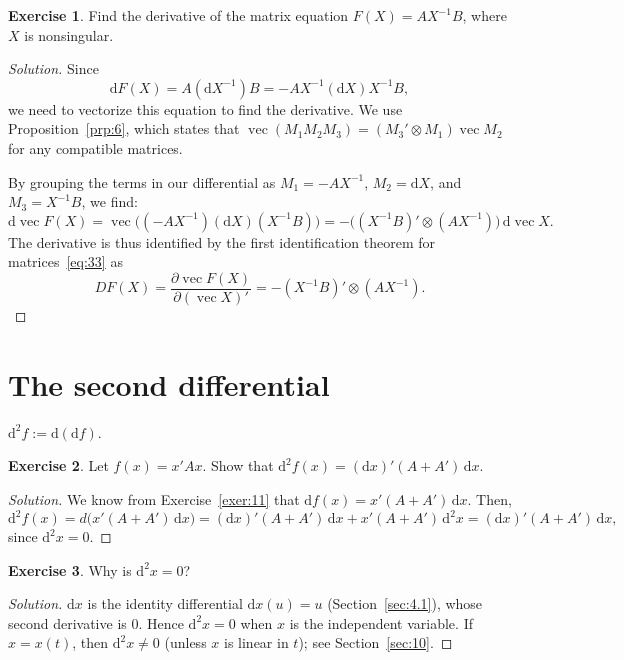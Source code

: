 \documentclass[14pt]{extarticle}
\theoremstyle{plain}
\theoremstyle{definition}
\newtheorem{exercise}{Exercise}
\theoremstyle{remark}
\newenvironment{solution}{%
  \begin{proof}[Solution]%
}{%
  \end{proof}%
}
\DeclareMathOperator{\avec}{vec}
\newcommand{\dd}{\mathrm{d}}
\begin{document}
\begin{exercise}\label{exer:22}
Find the derivative of the matrix equation $F(X) = AX^{-1}B$, where $X$ is nonsingular.
\end{exercise}

\begin{solution}
Since
\[
\dd F(X) = A(\dd X^{-1})B = -AX^{-1}(\dd X)X^{-1}B,
\]
we need to vectorize this equation to find the derivative. We use Proposition~\ref{prp:6}, which states that $\avec(M_1 M_2 M_3) = (M_3' \otimes M_1) \avec M_2$ for any compatible matrices.

By grouping the terms in our differential as $M_1 = -AX^{-1}$, $M_2 = \dd X$, and $M_3 = X^{-1}B$, we find:
\[
\dd\avec F(X) = \avec\bigl((-AX^{-1})(\dd X)(X^{-1}B)\bigr) = -\bigl((X^{-1}B)' \otimes (AX^{-1})\bigr)\, \dd\avec X.
\]
The derivative is thus identified by the first identification theorem for matrices~\eqref{eq:33} as
\[
DF(X) = \frac{\partial \avec F(X)}{\partial(\avec X)'} = -(X^{-1}B)' \otimes (AX^{-1}).
\]
\end{solution}

\section{The second differential}\label{sec:9}

$\dd^2 f := \dd(\dd f)$.

\begin{exercise}\label{exer:23}
Let $f(x) = x'Ax$. Show that $\dd^2 f(x) = (\dd x)'(A + A')\, \dd x$.
\end{exercise}

\begin{solution}
We know from Exercise~\ref{exer:11} that $\dd f(x) = x'(A + A')\, \dd x$. Then,
\[
\dd^2 f(x) = d\bigl(x'(A + A')\, \dd x\bigr) = (\dd x)'(A + A')\, \dd x + x'(A + A')\, \dd^2 x
= (\dd x)'(A + A')\, \dd x,
\]
since $\dd^2 x = 0$.
\end{solution}

\begin{exercise}\label{exer:24}
Why is $\dd^2 x = 0$?
\end{exercise}

\begin{solution}
$\dd x$ is the identity differential $\dd x(u) = u$ (Section~\ref{sec:4.1}), whose second derivative is $0$. Hence $\dd^2 x = 0$ when $x$ is the independent variable. If $x = x(t)$, then $\dd^2 x \neq 0$ (unless $x$ is linear in $t$); see Section~\ref{sec:10}.
\end{solution}
\end{document}
